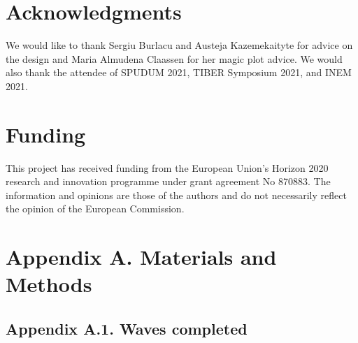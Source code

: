 \documentclass[authordate, empirical]{jote-new-article}
\begin{document}
\section{Acknowledgments}



We would like to thank Sergiu Burlacu and Austeja Kazemekaityte for advice on the design and Maria Almudena Claassen for her magic plot advice. We would also thank the attendee of SPUDUM 2021, TIBER Symposium 2021, and INEM 2021.


\section{Funding}
This project has received funding from the European Union's Horizon 2020 research and innovation programme under grant agreement No 870883. The information and opinions are those of the authors and do not necessarily reflect the opinion of the European Commission.

\printbibliography

\clearpage
\onecolumn
\appendix




\renewcommand\thefigure{A.\arabic{figure}}
\renewcommand\thetable{A.\arabic{table}}

\section{Appendix A. Materials and Methods}



\subsection{Appendix A.1. Waves completed}
\end{document}
